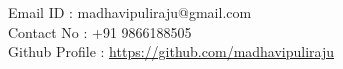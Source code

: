 \documentclass{resume} %
\newcommand{\blank}[1]{\hspace*{#1}}
\begin{document}
\blank{5 cm}
{Email ID} \blank{0.7 cm} :
madhavipuliraju@gmail.com \\
\blank{5 cm} 
{Contact No} \blank{0.3 cm} :
+91 9866188505 \\
\blank{5 cm}
{Github Profile : }
\url{https://github.com/madhavipuliraju}
\sectionlineskip \hfill


  


\end{document}
